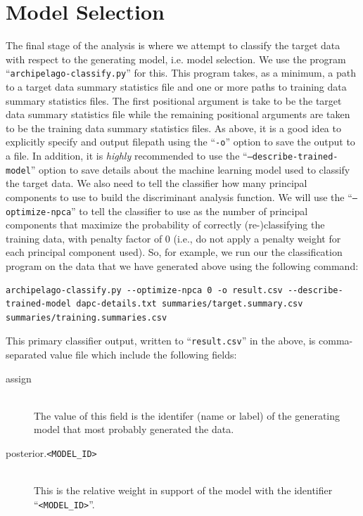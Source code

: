 \documentclass[11pt,openany]{memoir} %
\begin{document}
\section{Model Selection}

The final stage of the analysis is where we attempt to classify the target data with respect to the generating model, i.e. model selection.
We use the program ``\texttt{archipelago-classify.py}'' for this.
This program takes, as a minimum, a path to a target data summary statistics file and one or more paths to training data summary statistics files.
The first positional argument is take to be the target data summary statistics file while the remaining positional arguments are taken to be the training data summary statistics files.
As above, it is a good idea to explicitly specify and output filepath using the ``\texttt{-o}'' option to save the output to a file.
In addition, it is \textit{highly} recommended to use the ``\texttt{--describe-trained-model}'' option to save details about the machine learning model used to classify the target data.
We also need to tell the classifier how many principal components to use to build the discriminant analysis function.
We will use the ``\texttt{--optimize-npca}'' to tell the classifier to use as the number of principal components that maximize the probability of correctly (re-)classifying the training data, with  penalty factor of $0$ (i.e., do not apply a penalty weight for each principal component used).
So, for example, we run our the classification program on the data that we have generated above using the following command:
\begin{lstlisting}
archipelago-classify.py --optimize-npca 0 -o result.csv --describe-trained-model dapc-details.txt summaries/target.summary.csv summaries/training.summaries.csv
\end{lstlisting}
This primary classifier output, written to ``\texttt{result.csv}'' in the above, is comma-separated value file which include the following fields:
\begin{description}
    \item[assign] \hfill \\
        The value of this field is the identifer (name or label) of the generating model that most probably generated the data.
    \item[posterior.\texttt{<MODEL\_ID>}] \hfill \\
        This is the relative weight in support of the model with the identifier ``\texttt{<MODEL\_ID>}''.
\end{description}
\end{document}
